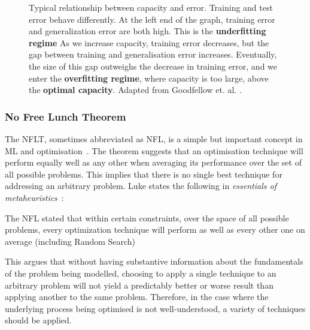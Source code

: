 \begin{figure}[htp]
    \centering
    
    \captionsetup{format=hang} %
    \caption{
        Typical relationship between capacity and error. Training and test error
        behave differently. At the left end of the graph, training error and
        generalization error are both high. This is the \textbf{underfitting
        regime} As we increase capacity, training error decreases, but the gap
        between training and generalisation error increases. Eventually, the
        size of this gap outweighs the decrease in training error, and we enter
        the \textbf{overfitting regime}, where capacity is too large, above the
        \textbf{optimal capacity}. Adapted from Goodfellow et. al.
        \cite{Goodfellow-et-al-2016}.
    }
    \label{fig:capacity}
\end{figure}

\subsubsection{No Free Lunch Theorem}

The \gls{NFLT}, sometimes abbreviated as \gls{NFL}, is a simple but important
concept in \gls{ML} and optimisation~\cite{Wolpert1997}. The theorem suggests
that an optimisation technique will perform equally well as any other when
averaging its performance over the set of all possible problems. This implies
that there is no single best technique for addressing an arbitrary problem. Luke
states the following in \textit{essentials of
metaheuristics}~\cite{luke2012essentials}:

\begin{fancyquotes}
    The \gls{NFL} stated that within certain constraints, over the space of
    all possible problems, every optimization technique will perform as well as
    every other one on average (including Random Search)
\end{fancyquotes}

This argues that without having substantive information about the fundamentals
of the problem being modelled, choosing to apply a single technique to an
arbitrary problem will not yield a predictably better or worse result than
applying another to the same problem. Therefore, in the case where the
underlying process being optimised is not well-understood, a variety of
techniques should be applied.

